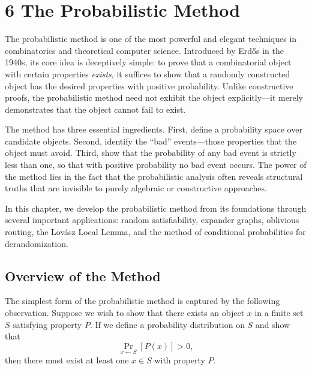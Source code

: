 \documentclass[twoside,12pt]{book}
\theoremstyle{plain}
\theoremstyle{definition}
\theoremstyle{remark}
\begin{document}
\chapter*{6 The Probabilistic Method}
\label{ch:probabilistic-method}

The probabilistic method is one of the most powerful and elegant techniques
in combinatorics and theoretical computer science. Introduced by
Erd\H{o}s in the 1940s, its core idea is deceptively simple: to prove that
a combinatorial object with certain properties \emph{exists}, it suffices
to show that a randomly constructed object has the desired properties with
positive probability. Unlike constructive proofs, the probabilistic method
need not exhibit the object explicitly---it merely demonstrates that the
object cannot fail to exist.

The method has three essential ingredients. First, define a probability
space over candidate objects. Second, identify the ``bad'' events---those
properties that the object must avoid. Third, show that the probability of
any bad event is strictly less than one, so that with positive probability
no bad event occurs. The power of the method lies in the fact that the
probabilistic analysis often reveals structural truths that are invisible
to purely algebraic or constructive approaches.

In this chapter, we develop the probabilistic method from its foundations
through several important applications: random satisfiability, expander
graphs, oblivious routing, the Lov\'{a}sz Local Lemma, and the method of
conditional probabilities for derandomization.

\section{Overview of the Method}
\label{sec:prob-method-overview}

The simplest form of the probabilistic method is captured by the following
observation. Suppose we wish to show that there exists an object $x$ in a
finite set $S$ satisfying property $P$. If we define a probability
distribution on $S$ and show that
\[
\Pr_{x \leftarrow S}[P(x)] > 0,
\]
then there must exist at least one $x \in S$ with property $P$.
\end{document}
